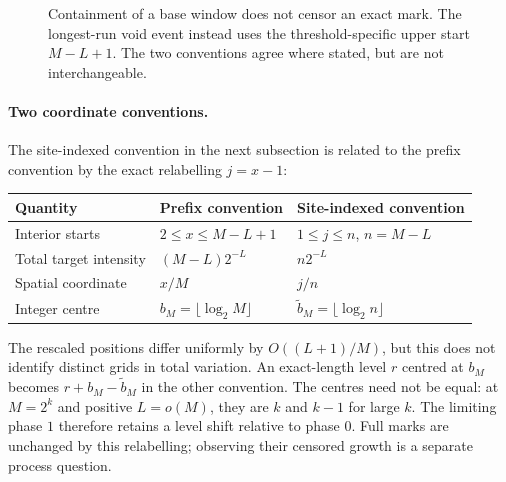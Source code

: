 \begin{figure}[htbp]\centering
{}
\caption{Containment of a base window does not censor an exact mark.
The longest-run void event instead uses the threshold-specific upper
start $M-L+1$. The two conventions agree where stated, but are not
interchangeable.}\label{fig:containment}
\end{figure}

\paragraph{Two coordinate conventions.}
The site-indexed convention in the next subsection is related to the
prefix convention by the exact relabelling $j=x-1$:
\begin{center}\small
\begin{tabularx}{\textwidth}{@{}lXX@{}}\toprule
Quantity & Prefix convention & Site-indexed convention\\\midrule
Interior starts & $2\le x\le M-L+1$ & $1\le j\le n$, $n=M-L$\\
Total target intensity & $(M-L)2^{-L}$ & $n2^{-L}$\\
Spatial coordinate & $x/M$ & $j/n$\\
Integer centre & $b_M=\lfloor\log_2M\rfloor$ & $\widetilde b_M=\lfloor\log_2n\rfloor$\\\bottomrule
\end{tabularx}
\end{center}
The rescaled positions differ uniformly by $O((L+1)/M)$, but this does
not identify distinct grids in total variation. An exact-length level
$r$ centred at $b_M$ becomes $r+b_M-\widetilde b_M$ in the other
convention. The centres need not be equal: at $M=2^k$ and positive
$L=o(M)$, they are $k$ and $k-1$ for large $k$. The limiting phase $1$
therefore retains a level shift relative to phase $0$. Full marks are
unchanged by this relabelling; observing their censored growth is a
separate process question.

